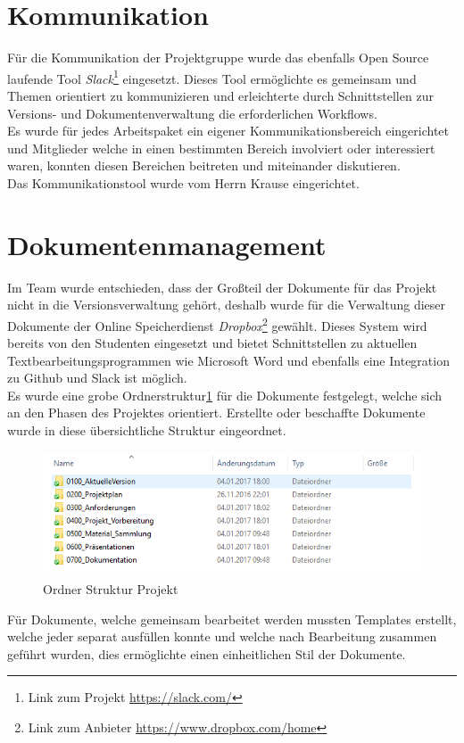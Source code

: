 \section{Kommunikation}
Für die Kommunikation der Projektgruppe wurde das ebenfalls Open Source laufende Tool \textit{Slack}\footnote{Link zum Projekt \url{https://slack.com/}} eingesetzt. Dieses Tool ermöglichte es gemeinsam und Themen orientiert zu kommunizieren und erleichterte durch Schnittstellen zur Versions- und Dokumentenverwaltung die erforderlichen Workflows.\\
Es wurde für jedes Arbeitspaket ein eigener Kommunikationsbereich eingerichtet und Mitglieder welche in einen bestimmten Bereich involviert oder interessiert waren, konnten diesen Bereichen beitreten und miteinander diskutieren.\\
Das Kommunikationstool wurde vom Herrn Krause eingerichtet.

\section{Dokumentenmanagement}
Im Team wurde entschieden, dass der Großteil der Dokumente für das Projekt nicht in die Versionsverwaltung gehört, deshalb wurde für die Verwaltung dieser Dokumente der Online Speicherdienst \textit{Dropbox}\footnote{Link zum Anbieter \url{https://www.dropbox.com/home}} gewählt. Dieses System wird bereits von den Studenten eingesetzt und bietet Schnittstellen zu aktuellen Textbearbeitungsprogrammen wie Microsoft Word und ebenfalls eine Integration zu Github und Slack ist möglich.\\
Es wurde eine grobe Ordnerstruktur\ref{fig:folderStruct} für die Dokumente festgelegt, welche sich an den Phasen des Projektes orientiert. Erstellte oder beschaffte Dokumente wurde in diese übersichtliche Struktur eingeordnet.\\
\begin{figure}[h]
\includegraphics[scale=1]{projectdefinition/Bilder/FolderStructure}
\caption{Ordner Struktur Projekt}
\label{fig:folderStruct}
\end{figure}
Für Dokumente, welche gemeinsam bearbeitet werden mussten Templates erstellt, welche jeder separat ausfüllen konnte und welche nach Bearbeitung zusammen geführt wurden, dies ermöglichte einen einheitlichen Stil der Dokumente.
